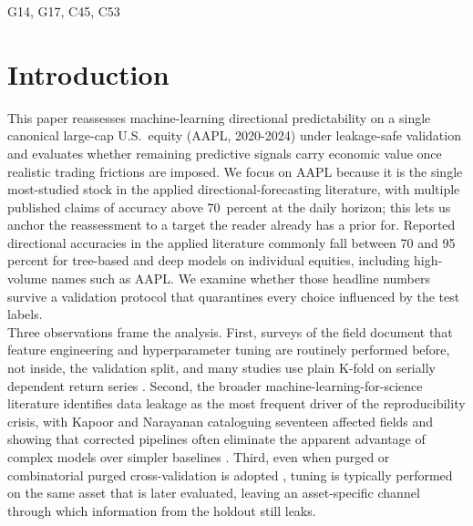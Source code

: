 \documentclass{rQUF2e}
\begin{document}
\begin{classcode}
G14, G17, C45, C53
\end{classcode}

\section{Introduction}

This paper reassesses machine-learning directional predictability
on a single canonical large-cap U.S.\ equity (AAPL, 2020-2024)
under leakage-safe validation and evaluates whether remaining
predictive signals carry economic value once realistic trading
frictions are imposed. We focus on AAPL because it is the
single most-studied stock in the applied directional-forecasting
literature, with multiple published claims of accuracy above
70~percent at the daily horizon; this lets us anchor the
reassessment to a target the reader already has a prior for. Reported directional accuracies in
the applied literature commonly fall between 70 and 95 percent for
tree-based and deep models on individual equities, including
high-volume names such as AAPL. We examine whether those headline
numbers survive a validation protocol that quarantines every choice
influenced by the test labels. \\

\noindent Three observations frame the analysis. First, surveys of
the field document that feature engineering and hyperparameter
tuning are routinely performed before, not inside, the validation
split, and many studies use plain K-fold on serially dependent
return series \citep{sezer2020financial,jiang2021applications,htun2023survey}.
Second, the broader machine-learning-for-science literature
identifies data leakage as the most frequent driver of the
reproducibility crisis, with Kapoor and Narayanan cataloguing
seventeen affected fields and showing that corrected pipelines
often eliminate the apparent advantage of complex models over
simpler baselines \citep{kapoor2023leakage}. Third, even when
purged or combinatorial purged cross-validation is adopted
\citep{lopez2018advances,bailey2017dangers}, tuning is typically
performed on the same asset that is later evaluated, leaving an
asset-specific channel through which information from the holdout
still leaks. \\
\end{document}
